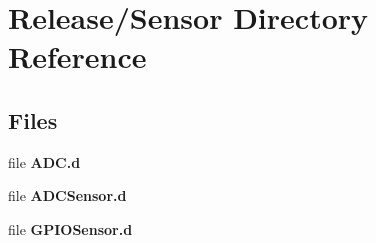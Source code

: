 \section{Release/\+Sensor Directory Reference}
\label{dir_89dee386584f2388eadba5c64c109d2c}
\subsection*{Files}
\begin{DoxyCompactItemize}
\item 
file {\bfseries A\+D\+C.\+d}
\item 
file {\bfseries A\+D\+C\+Sensor.\+d}
\item 
file {\bfseries G\+P\+I\+O\+Sensor.\+d}
\end{DoxyCompactItemize}
